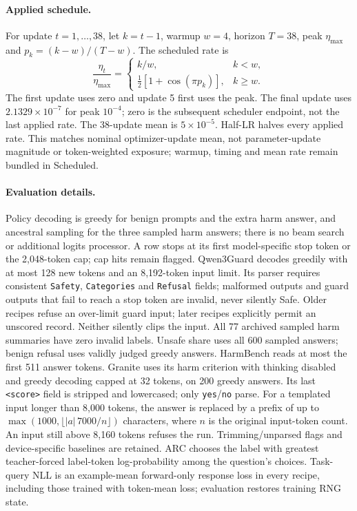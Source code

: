 \documentclass{article}
\begin{document}
\paragraph{Applied schedule.} For update $t=1,\ldots,38$, let $k=t-1$,
warmup $w=4$, horizon $T=38$, peak $\eta_{\max}$ and
$p_k=(k-w)/(T-w)$. The scheduled rate is
\[
\frac{\eta_t}{\eta_{\max}}=
\begin{cases}
 k/w,&k<w,\\
 \tfrac12[1+\cos(\pi p_k)],&k\geq w.
\end{cases}
\]
The first update uses zero and update 5 first uses the peak. The final
update uses $2.1329\times10^{-7}$ for peak $10^{-4}$; zero is the subsequent
scheduler endpoint, not the last applied rate. The 38-update mean is
$5\times10^{-5}$. Half-LR halves every applied rate. This matches nominal
optimizer-update mean, not parameter-update magnitude or token-weighted
exposure; warmup, timing and mean rate remain bundled in Scheduled.

\paragraph{Evaluation details.} Policy decoding is greedy for benign prompts
and the extra harm answer, and ancestral sampling for the three sampled
harm answers; there is no beam search or additional logits processor.
A row stops at its first model-specific stop token or the 2,048-token cap;
cap hits remain flagged. Qwen3Guard decodes greedily with at most 128 new
tokens and an 8,192-token input limit. Its parser requires consistent
\texttt{Safety}, \texttt{Categories} and \texttt{Refusal} fields; malformed
outputs and guard outputs that fail to reach a stop token are invalid, never
silently Safe. Older recipes refuse an over-limit guard input; later recipes explicitly
permit an unscored record. Neither silently clips the input. All 77 archived sampled
harm summaries have zero invalid labels. Unsafe share uses all 600 sampled
answers; benign refusal uses validly judged greedy answers. HarmBench reads
at most the first 511 answer tokens. Granite uses its harm criterion with
thinking disabled and greedy decoding capped at 32 tokens, on 200 greedy
answers. Its last \texttt{<score>} field is stripped and lowercased; only
\texttt{yes}/\texttt{no} parse. For a templated input longer than 8,000
tokens, the answer is replaced by a prefix of up to
$\max(1000,\lfloor |a|\,7000/n\rfloor)$ characters, where $n$ is the original
input-token count. An input still above 8,160 tokens refuses the run.
Trimming/unparsed flags and device-specific baselines are retained. ARC chooses the label with greatest teacher-forced
label-token log-probability among the question's choices. Task-query NLL is
an example-mean forward-only response loss in every recipe, including
those trained with token-mean loss; evaluation restores training RNG state.
\end{document}
